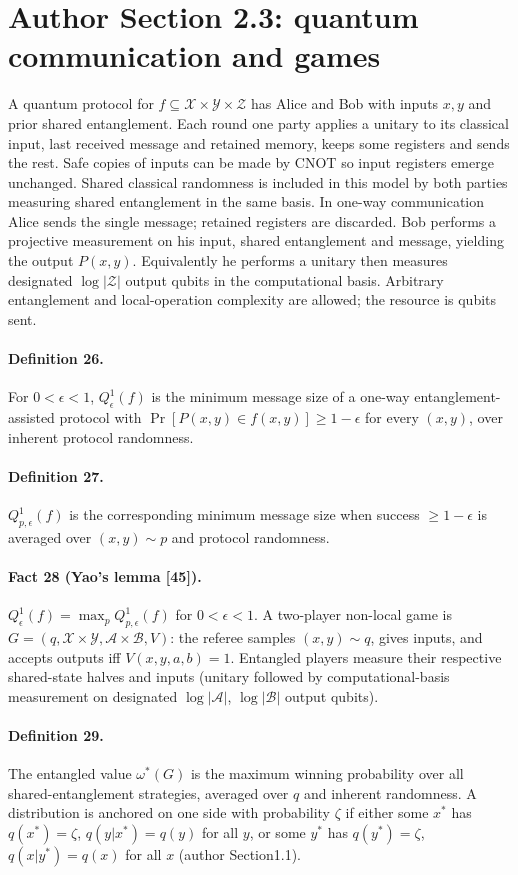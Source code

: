 \section*{Author Section 2.3: quantum communication and games}
A quantum protocol for $f\subseteq\mathcal X\times\mathcal Y\times\mathcal Z$ has Alice and Bob with inputs $x,y$ and prior shared entanglement. Each round one party applies a unitary to its classical input, last received message and retained memory, keeps some registers and sends the rest. Safe copies of inputs can be made by CNOT so input registers emerge unchanged. Shared classical randomness is included in this model by both parties measuring shared entanglement in the same basis. In one-way communication Alice sends the single message; retained registers are discarded. Bob performs a projective measurement on his input, shared entanglement and message, yielding the output $P(x,y)$. Equivalently he performs a unitary then measures designated $\log|\mathcal Z|$ output qubits in the computational basis. Arbitrary entanglement and local-operation complexity are allowed; the resource is qubits sent.
\paragraph{Definition 26.} For $0<\epsilon<1$, $Q^1_\epsilon(f)$ is the minimum message size of a one-way entanglement-assisted protocol with $\Pr[P(x,y)\in f(x,y)]\ge1-\epsilon$ for every $(x,y)$, over inherent protocol randomness.
\paragraph{Definition 27.} $Q^1_{p,\epsilon}(f)$ is the corresponding minimum message size when success $\ge1-\epsilon$ is averaged over $(x,y)\sim p$ and protocol randomness.
\paragraph{Fact 28 (Yao's lemma [45]).} $Q^1_\epsilon(f)=\max_pQ^1_{p,\epsilon}(f)$ for $0<\epsilon<1$.
A two-player non-local game is $G=(q,\mathcal X\times\mathcal Y,\mathcal A\times\mathcal B,V)$: the referee samples $(x,y)\sim q$, gives inputs, and accepts outputs iff $V(x,y,a,b)=1$. Entangled players measure their respective shared-state halves and inputs (unitary followed by computational-basis measurement on designated $\log|\mathcal A|$, $\log|\mathcal B|$ output qubits).
\paragraph{Definition 29.} The entangled value $\omega^*(G)$ is the maximum winning probability over all shared-entanglement strategies, averaged over $q$ and inherent randomness. A distribution is anchored on one side with probability $\zeta$ if either some $x^*$ has $q(x^*)=\zeta$, $q(y|x^*)=q(y)$ for all $y$, or some $y^*$ has $q(y^*)=\zeta$, $q(x|y^*)=q(x)$ for all $x$ (author Section1.1).
